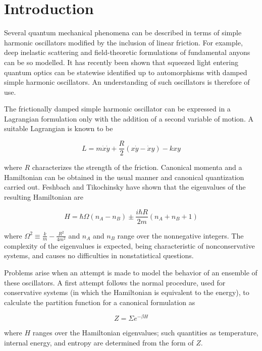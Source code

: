 \chapter{Introduction}

Several quantum mechanical phenomena can be described in terms of simple
harmonic oscillators modified by the inclusion of linear friction.  For
example, deep inelastic scattering and field-theoretic formulations of
fundamental anyons can be so modelled.  It has recently been shown \cite{emmg}
that squeezed light entering quantum optics can be statewise identified up to
automorphisms with damped simple harmonic oscillators.  An understanding of 
such oscillators is therefore of use.

The frictionally damped simple harmonic oscillator can be expressed in a
Lagrangian formulation only with the addition of a second variable of motion.
A suitable Lagrangian is known to be \cite{mf:mtp} 

\begin{equation}
L = m \dot{x} \dot{y} + \frac{R}{2} (x \dot{y} - \dot{x} y) - k x y
\end{equation}

where $R$ characterizes the strength of the friction.  Canonical momenta and
a Hamiltonian can be obtained in the usual manner and canonical quantization
carried out.  Feshbach and Tikochinsky have shown \cite{ft:fest} that the 
eigenvalues of the resulting Hamiltonian are

\begin{equation}
H = \hbar \Omega (n_{A} - n_{B}) \pm \frac{i \hbar R}{2 m} (n_{A} + n_{B} + 1)
\end{equation}

where $\Omega^{2} \equiv \frac{k}{m} - \frac{R^{2}}{4 m^{2}}$ and $n_{A}$ and
$n_{B}$ range over the nonnegative integers.  The complexity of the eigenvalues
is expected, being characteristic of nonconservative systems, and causes no
difficulties in nonstatistical questions.

Problems arise when an attempt is made to model the behavior of an ensemble
of these oscillators.  A first attempt follows the normal procedure, used for
conservative systems (in which the Hamiltonian is equivalent to the energy),
to calculate the partition function for a canonical formulation as

\begin{equation}
Z = \Sigma e^{- \beta H}
\end{equation}

where $H$ ranges over the Hamiltonian eigenvalues; such quantities as
temperature, internal energy, and entropy are determined from the form of $Z$.

